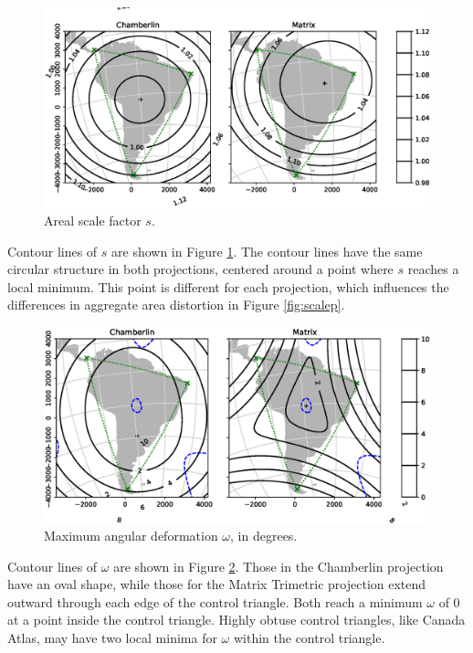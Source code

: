 \documentclass[]{interact}
\begin{document}
\begin{figure}%
  \includegraphics[width=\textwidth]{SA_Wall_Map_scale}
  \caption{Areal scale factor $s$.}
  \label{fig:scale}
\end{figure}

Contour lines of $s$ are shown in Figure \ref{fig:scale}. The contour lines
have the same circular structure in both projections, centered around a
point where $s$ reaches a local minimum. This point is different for each
projection, which influences the differences in aggregate area distortion in
Figure \ref{fig:scalep}.

\begin{figure}%
  \includegraphics[width=\textwidth]{SA_Wall_Map_omega}
  \caption{Maximum angular deformation $\omega$, in degrees.}
  \label{fig:angle}
\end{figure}

Contour lines of $\omega$ are shown in Figure \ref{fig:angle}. Those in the
Chamberlin projection have an oval shape, while those for the Matrix Trimetric
projection extend outward through each edge of the control triangle.
Both reach a minimum $\omega$ of 0 at a point inside the control triangle.
Highly obtuse control triangles, like Canada Atlas,
may have two local minima for $\omega$ within the control triangle.
\end{document}
